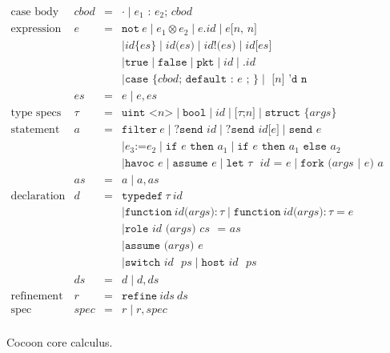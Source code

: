 \documentclass{report}
\begin{document}
\begin{figure}
\[\begin{array}{lrcl}
\textrm{case body} & cbod & = & \cdot \mid \textrm{$e_1$ : $e_2$; } cbod \\
\textrm{expression} & e & = & \texttt{not}~e \mid e_1 \otimes e_2 \mid e \texttt{.} id \mid e \texttt{[$n$, $n$]} \\
              &   &   &  \mid \texttt{$id$\{$es$\}} \mid \texttt{$id$($es$)} \mid \texttt{$id$!($es$)} \mid \texttt{$id$[$es$]} \\
              &   &   &  \mid \texttt{true} \mid \texttt{false} \mid \texttt{pkt} \mid id \mid \texttt{.$id$} \\
              &   &   &  \mid \texttt{case \{$cbod$; default : $e$ ; \}} \mid \texttt{ [$n$]~'d~n } \\
              & es & = & e \mid e, es \\
\textrm{type specs} & \tau & = & \texttt{uint <} n \texttt{>}
                                 \mid \texttt{bool}
                                 \mid id
                                 \mid \texttt{[} \tau \texttt{;} n \texttt{]}
                                 \mid \texttt{struct \{} \textit{args} \texttt{\}} \\
\textrm{statement} & a & = & \texttt{filter}~e \mid \texttt{?send $id$} \mid \texttt{?send $id$[$e$]} \mid \texttt{send $e$} \\
                   &   &   & \mid e_3 \texttt{:=} e_2 \mid \texttt{if $e$ then $a_1$} \mid \texttt{if $e$ then $a_1$ else $a_2$} \\
                   &   &   & \mid \texttt{havoc $e$} \mid \texttt{assume $e$} \mid \texttt{let $\tau$ $id$ = $e$} \mid \texttt{fork ($args$ | $e$) $a$} \\
                   & as & = & a \mid a, as \\
\textrm{declaration} & d & = & \texttt{typedef}~\tau~id \\
                     &   &   & \mid \texttt{function}~id \texttt{(} args \texttt{)} : \tau \mid \texttt{function}~id \texttt{(} args \texttt{)} : \tau = e \\
                     &   &   & \mid \texttt{role~$id$ ($args$)~$cs$~ = $as$} \\
                     &   &   & \mid \texttt{assume ($args$) $e$} \\
                     &   &   & \mid \texttt{switch $id$ $ps$} \mid \texttt{host $id$ $ps$} \\
                     & ds & = & d \mid d, ds \\
\textrm{refinement} & r & = & \texttt{refine}~ids~ds \\
\textrm{spec} & spec & = & r \mid r, spec \\

\end{array} \]
\caption{Cocoon core calculus.}
\label{fig:core_calc}
\end{figure}
\end{document}
